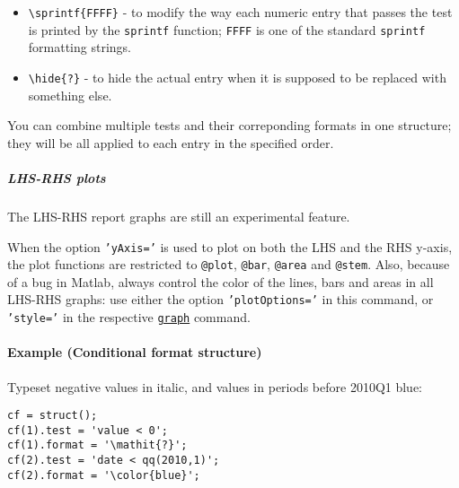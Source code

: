 \begin{itemize}
\item
  \texttt{\textbackslash{}sprintf\{FFFF\}} - to modify the way each
  numeric entry that passes the test is printed by the \texttt{sprintf}
  function; \texttt{FFFF} is one of the standard \texttt{sprintf}
  formatting strings.
\item
  \texttt{\textbackslash{}hide\{?\}} - to hide the actual entry when it
  is supposed to be replaced with something else.
\end{itemize}

You can combine multiple tests and their correponding formats in one
structure; they will be all applied to each entry in the specified
order.

\subparagraph{LHS-RHS plots}\label{lhs-rhs-plots}

The LHS-RHS report graphs are still an experimental feature.

When the option \texttt{'yAxis='} is used to plot on both the LHS and
the RHS y-axis, the plot functions are restricted to \texttt{@plot},
\texttt{@bar}, \texttt{@area} and \texttt{@stem}. Also, because of a bug
in Matlab, always control the color of the lines, bars and areas in all
LHS-RHS graphs: use either the option \texttt{'plotOptions='} in this
command, or \texttt{'style='} in the respective
\href{report/graph}{\texttt{graph}} command.

\paragraph{Example (Conditional format
structure)}\label{example-conditional-format-structure}

Typeset negative values in italic, and values in periods before 2010Q1
blue:

\begin{verbatim}
cf = struct();
cf(1).test = 'value < 0';
cf(1).format = '\mathit{?}';
cf(2).test = 'date < qq(2010,1)';
cf(2).format = '\color{blue}';
\end{verbatim}


